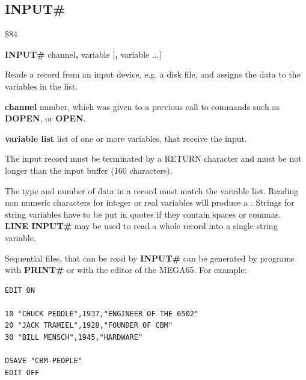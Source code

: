 
\newpage
\subsection{INPUT\#}
\begin{description}[leftmargin=2cm,style=nextline]
\item [Token:] \$84
\item [Format:] {\bf INPUT\#} channel{\bf,} variable [{\bf,} variable ...]
\item [Usage:] Reads a record
               from an input device, e.g. a disk file,
               and assigns the data
               to the variables in the list.

               {\bf channel} number, which was given to a previous
               call to commands such as {\bf DOPEN}, or {\bf OPEN}.

               {\bf variable list} list of one or more
               variables, that receive the input.

               The input record must be terminated by a
               RETURN character and must be not longer than
               the input buffer (160 characters).

\item [Remarks:] The type and number of data in a record must
               match the variable list.
               Reading non numeric characters for integer or real
               variables will produce a .
               Strings for string variables have to be put in quotes
               if they contain spaces or commas. \\
               {\bf LINE INPUT\#} may be used to
               read a whole record into a single string variable.

               Sequential files, that can be read by {\bf INPUT\#}
               can be generated by programs with {\bf PRINT\#}
               or with the editor of the MEGA65.
               For example:

\begin{tcolorbox}[colback=black,coltext=white]
\verbatimfont{\codefont}
\begin{verbatim}
EDIT ON

10 "CHUCK PEDDLE",1937,"ENGINEER OF THE 6502"
20 "JACK TRAMIEL",1928,"FOUNDER OF CBM"
30 "BILL MENSCH",1945,"HARDWARE"

DSAVE "CBM-PEOPLE"
EDIT OFF
\end{verbatim}
\end{tcolorbox}


\end{description}
